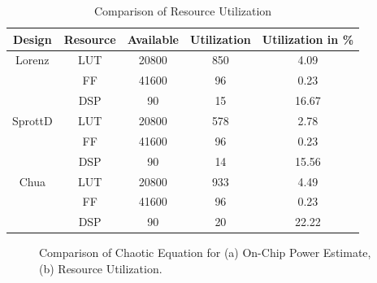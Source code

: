 \begin{table}[b]
	\centering
	\caption{Comparison of Resource Utilization}
	\vspace*{0.2in}
	\begin{tabular}{| c | c | c | c |c | }
		\hline
		Design & Resource & Available & Utilization & Utilization in \% \\ 
		\hline 
	Lorenz & LUT & 20800& 850 & 4.09 \\
	{} & FF & 41600& 96 & 0.23 \\
	{} & DSP & 90 & 15 & 16.67 \\
	\hline 
	SprottD & LUT & 20800& 578 & 2.78 \\
	{} & FF & 41600& 96 & 0.23 \\
    {} & DSP & 90 & 14 & 15.56 \\
    \hline
	Chua & LUT & 20800& 933 & 4.49 \\
	{} & FF & 41600& 96 & 0.23 \\
	{} & DSP & 90& 20 & 22.22 \\
		\hline
	\end{tabular}
	\label{tab:resources}
\end{table}

 \begin{figure}[t]
        \centering
        \qquad
        \vspace{-6pt}
        \caption{Comparison of Chaotic Equation for (a) On-Chip Power Estimate, (b) Resource Utilization.}
        \label{fig:resource}%
    \end{figure}


